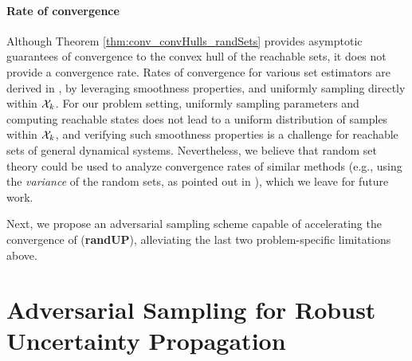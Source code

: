 \documentclass{article}
\begin{document}
\vspace{-2mm}\paragraph{Rate of convergence} Although Theorem \ref{thm:conv_convHulls_randSets} provides asymptotic guarantees of convergence to the convex hull of the reachable sets, it does not provide a convergence rate. Rates of convergence for various set estimators are derived in \citep{Kor1993_BookMinimaxImgReconstr,Rodriguez2016}, by leveraging smoothness properties, and uniformly sampling directly within $\mathcal{X}_k$. For our problem setting, uniformly sampling parameters and computing reachable states does not lead to a uniform distribution of samples within $\mathcal{X}_k$, and verifying such smoothness properties is a challenge for reachable sets of general dynamical systems. Nevertheless, we believe that random set theory could be used to analyze convergence rates of similar methods (e.g., using the \textit{variance} of the random sets, as pointed out in \citep{ChevalierKriging2014}), which we leave for future work. 


Next, we propose an adversarial sampling scheme capable of accelerating the convergence of (\textbf{randUP}), alleviating the last two problem-specific limitations above.


\section{Adversarial Sampling for Robust Uncertainty Propagation}\label{sec:UP_adv}
\end{document}
